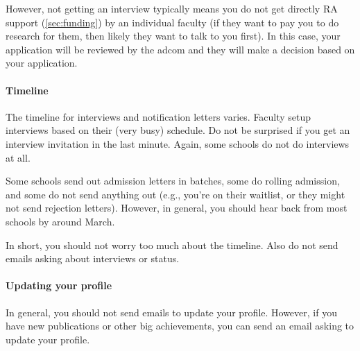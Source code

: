 \documentclass[oneside,11pt]{memoir}
\begin{document}
However, not getting an interview typically means you do not get directly RA support (\autoref{sec:funding}) by an individual faculty (if they want to pay you to do research for them, then likely they want to talk to you first).  In this case, your application will be reviewed by the adcom and they will make a decision based on your application.

\paragraph{Timeline} The timeline for interviews and notification letters varies.  Faculty setup interviews based on their (very busy) schedule. Do not be surprised if you get an interview invitation in the last minute. Again, some schools do not do interviews at all.

Some schools send out admission letters in batches, some do rolling admission, and some do not send anything out (e.g., you're on their waitlist, or they might not send rejection letters).  However, in general, you should hear back from most schools by around March.

In short, you should not worry too much about the timeline. Also do not send emails asking about interviews or status.


\paragraph{Updating your profile} In general, you should not send emails to update your profile.  However, if you have new publications or other big achievements, you can send an email asking to update your profile.




\end{document}
